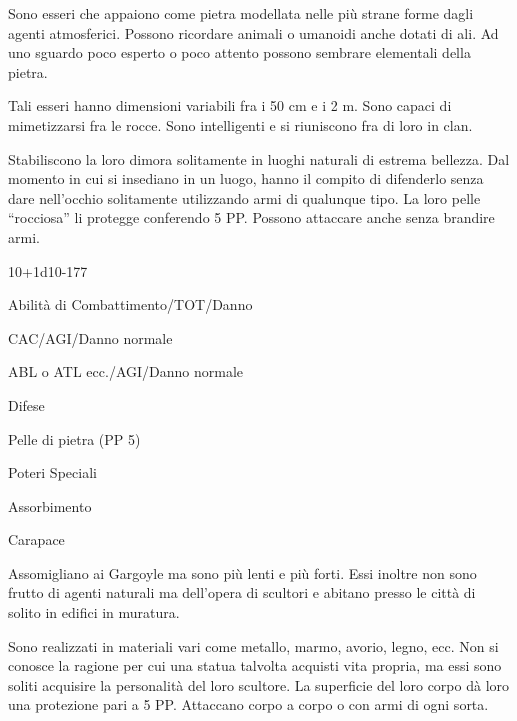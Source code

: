 
Sono esseri che appaiono come pietra modellata nelle pi\`u strane
forme dagli agenti atmosferici. Possono ricordare animali o umanoidi
anche dotati di ali. Ad uno sguardo poco esperto o poco attento
possono sembrare elementali della pietra.

Tali esseri hanno dimensioni variabili fra i 50 cm e i 2 m. Sono
capaci di mimetizzarsi fra le rocce. Sono intelligenti e si riuniscono
fra di loro in clan.

Stabiliscono la loro dimora solitamente in luoghi naturali di estrema
bellezza. Dal momento in cui si insediano in un luogo, hanno il
compito di difenderlo senza dare nell'occhio solitamente utilizzando
armi di qualunque tipo. La loro pelle ``rocciosa'' li protegge
conferendo 5 PP. Possono attaccare anche senza brandire armi.

{10+1d10}{-}{177}

\begin{parmostro}{Abilit\`a di Combattimento/TOT/Danno}
\item CAC/AGI/Danno normale
\item ABL o ATL ecc./AGI/Danno normale
\end{parmostro}

\begin{parmostro}{Difese}
\item Pelle di pietra (PP 5)
\end{parmostro}

\begin{parmostro}{Poteri Speciali}
\item  Assorbimento
\item  Carapace
\end{parmostro}


Assomigliano ai Gargoyle ma sono pi\`u lenti e pi\`u forti. Essi
inoltre non sono frutto di agenti naturali ma dell'opera di scultori e
abitano presso le citt\`a di solito in edifici in muratura.  

Sono realizzati in materiali vari come metallo, marmo, avorio, legno,
ecc.  Non si conosce la ragione per cui una statua talvolta acquisti
vita propria, ma essi sono soliti acquisire la personalit\`a del
loro scultore. La superficie del loro corpo d\`a loro una protezione
pari a 5 PP. Attaccano corpo a corpo o con armi di ogni sorta.

